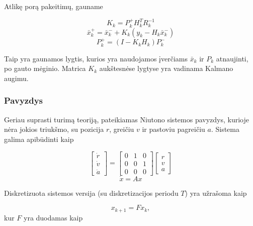     Atlikę porą pakeitimų, gauname

    \begin{equation}
        K_k = P_{k}^+H_k^TR_k^{-1}
    \end{equation}
    \begin{equation}
        \bar{x}_k^+ = \bar{x}_k^- + K_k(y_k - H_k\bar{x}_k^-)
    \end{equation}
    \begin{equation}
        P_k^+ = (I-K_kH_k)P_{k}^-
    \end{equation}

    Taip yra gaunamos lygtis, kurios yra naudojamos įverčiams $\bar{x}_k$ ir $P_k$ atnaujinti, po gauto mėginio.
    Matrica $K_k$ aukštesnėse lygtyse yra vadinama Kalmano augimu.

    \subsubsection{Pavyzdys}

    Geriau suprasti turimą teoriją, pateikiamas Niutono sistemos pavyzdys, kurioje nėra jokios triukšmo, su pozicija $r$, greičiu $v$ ir pastoviu pagreičiu $a$.
    Sistema galima apibūdinti kaip

    \begin{equation}
        \begin{bmatrix} \dot{r} \\ \dot{v} \\ \dot{a} \end{bmatrix} =
        \begin{bmatrix} 0 & 1 & 0 \\ 0 & 0 & 1 \\ 0 & 0 & 0 \end{bmatrix}
        \begin{bmatrix} r \\ v \\ a \end{bmatrix}
    \end{equation}
    \begin{equation}
        \dot{x} = Ax
    \end{equation}

    Diskretizuota sistemos versija (su diskretizacijos periodu $T$) yra užrašoma kaip\

    \begin{equation}
        x_{k+1} = Fx_k,
    \end{equation}
    kur $F$ yra duodamas kaip

